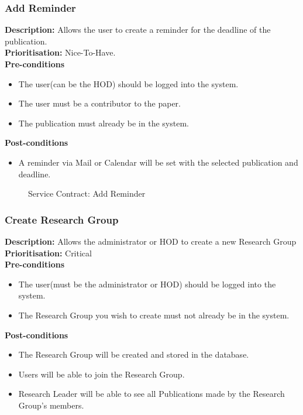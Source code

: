 \documentclass[a4paper]{article}
\begin{document}
	\pagebreak
	\subsubsection{Add Reminder}
	\textbf{Description:} Allows the user to create a reminder for the deadline of the publication.\\
	\textbf{Prioritisation:} Nice-To-Have.
	\\
	
	\textbf{Pre-conditions}
	\begin{itemize}
		\item The user(can be the HOD) should be logged into the system.
		\item The user must be a contributor to the paper.
		\item The publication must already be in the system.
	\end{itemize}
	
	\textbf{Post-conditions}
	\begin{itemize}
		\item A reminder via Mail or Calendar will be set with the selected publication and deadline.
	\end{itemize}
	
	\begin{figure}[H]
		\centering
		\caption{Service Contract: Add Reminder}
	\end{figure}
	
	\pagebreak
	\subsubsection{Create Research Group}
	\textbf{Description:} Allows the administrator or HOD to create a new Research Group\\
	\textbf{Prioritisation:} Critical\\
	
	\textbf{Pre-conditions}
	\begin{itemize}
		\item The user(must be the administrator or HOD) should be logged into the system.
		\item The Research Group you wish to create must not already be in the system.
	\end{itemize}
	
	\textbf{Post-conditions}
	\begin{itemize}
		\item The Research Group will be created and stored in the database.
		\item Users will be able to join the Research Group.
		\item Research Leader will be able to see all Publications made by the Research Group's members.
	\end{itemize}
	
\end{document}
